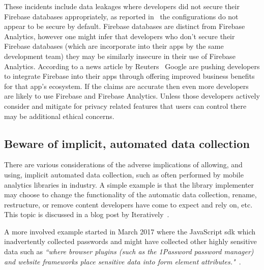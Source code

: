 These incidents include data leakages where developers did not secure their Firebase databases appropriately, as reported in~\cite{bischoff2020_firebase_missconfiguration} the configurations do not appear to be secure by default. Firebase databases are distinct from Firebase Analytics, however one might infer that developers who don't secure their Firebase databases (which are incorporate into their apps by the same development team) they may be similarly insecure in their use of Firebase Analytics. According to a news article by Reuters~ Google are pushing developers to integrate Firebase into their apps through offering improved business benefits for that app's ecosystem. If the claims are accurate then even more developers are likely to use Firebase and Firebase Analytics. Unless those developers actively consider and mitigate for privacy related features that users can control there may be additional ethical concerns.

% 

\subsection{Beware of implicit, automated data collection} \label{discussion-beware-implicit-automated-data-collection-topic}
There are various considerations of the adverse implications of allowing, and using, implicit automated data collection, such as often performed by mobile analytics libraries in industry. A simple example is that the library implementer may choose to change the functionality of the automatic data collection, rename, restructure, or remove content developers have come to expect and rely on, etc. This topic is discussed in a blog post by Iteratively~\cite{mukherjee_implicit_versus_explicit_event_tracking_hits_and_misses}.

A more involved example started in March 2017 where the  JavaScript \Gls{sdk} which inadvertently collected passwords and might have collected other highly sensitive data such as \emph{``where browser plugins (such as the 1Password password manager) and website frameworks place sensitive data into form element attributes."}~\cite{mcclintok_mixpanel_update_on_autotrack_data_collection}. 

